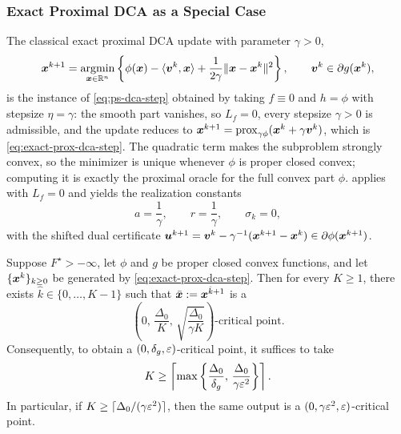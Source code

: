 \subsubsection{Exact Proximal DCA as a Special Case}

The classical exact proximal DCA update with parameter $\gamma>0$,
\begin{equation}
    \bm{x}^{k+1}
    =
    \operatorname*{\mathrm{argmin}}_{\bm{x}\in\mathbb{R}^n}
    \left\{
        \phi(\bm{x})-\langle\bm{v}^k,\bm{x}\rangle
        +
        \frac{1}{2\gamma}\|\bm{x}-\bm{x}^k\|^2
    \right\},
    \qquad
    \bm{v}^k\in\partial g(\bm{x}^k),
    \label{eq:exact-prox-dca-step}
\end{equation}
is the instance of \eqref{eq:ps-dca-step} obtained by taking
$f\equiv0$ and $h=\phi$ with stepsize $\eta=\gamma$: the smooth part
vanishes, so $L_f=0$, every stepsize $\gamma>0$ is admissible, and the
update reduces to
$\bm{x}^{k+1}=\mathrm{prox}_{\gamma\phi}(\bm{x}^k+\gamma\bm{v}^k)$, which is
\eqref{eq:exact-prox-dca-step}. The quadratic term makes the
subproblem strongly convex, so the minimizer is unique whenever
$\phi$ is proper closed convex; computing it is exactly the proximal
oracle for the full convex part $\phi$. 
applies with $L_f=0$ and yields the realization constants
\[
    a=\frac{1}{\gamma},
    \qquad
    r=\frac{1}{\gamma},
    \qquad
    \sigma_k=0,
\]
with the shifted dual certificate
$\bm{u}^{k+1}=\bm{v}^k-\gamma^{-1}(\bm{x}^{k+1}-\bm{x}^k)\in\partial\phi(\bm{x}^{k+1})$.

\begin{corollary}
\label{cor:exact-prox-dca-complexity}
Suppose $F^\star>-\infty$, let $\phi$ and $g$ be proper closed convex
functions, and let $\{\bm{x}^k\}_{k\ge0}$ be generated by
\eqref{eq:exact-prox-dca-step}. Then for every $K\ge1$, there exists
$\hat k\in\{0,\ldots,K-1\}$ such that
$\bar{\bm{x}}:=\bm{x}^{\hat k+1}$ is a
\begin{equation}
    \left(
        0,\,
        \frac{\Delta_0}{K},\,
        \sqrt{\frac{\Delta_0}{\gamma K}}
    \right)\text{-critical point}.
    \label{eq:exact-prox-dca-rate}
\end{equation}
Consequently, to obtain a $(0,\delta_g,\varepsilon)$-critical point, it
suffices to take
\begin{equation}
    K
    \ge
    \left\lceil
    \max\left\{
        \frac{\Delta_0}{\delta_g},\,
        \frac{\Delta_0}{\gamma\varepsilon^2}
    \right\}
    \right\rceil .
    \label{eq:exact-prox-dca-target-K}
\end{equation}
In particular, if $K\ge\lceil\Delta_0/(\gamma\varepsilon^2)\rceil$, then the
same output is a $(0,\gamma\varepsilon^2,\varepsilon)$-critical point.
\end{corollary}

